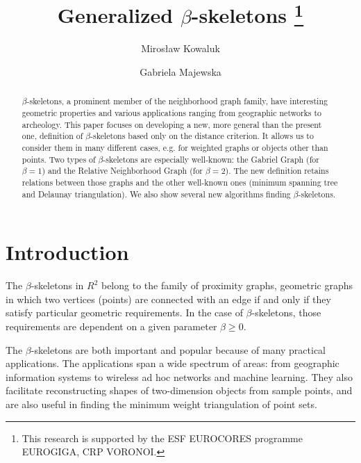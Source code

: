\documentclass[11pt]{llncs}
\begin{document}
\title{Generalized $\beta$-skeletons
\thanks{This research is supported by the ESF EUROCORES programme EUROGIGA,
CRP VORONOI.}}
\author{
        Miros{\l}aw Kowaluk  
\and
        Gabriela Majewska  
}


\maketitle

\begin{abstract}
$\beta$-skeletons, a prominent member of the neighborhood graph family, have
interesting geometric properties and various applications ranging from
geographic networks to archeology.
This paper focuses on developing a new, more general than the present one, definition
of $\beta$-skeletons based only on the distance criterion.
It allows us to consider them in many different cases, e.g. for weighted graphs 
or objects other than points.
Two types of $\beta$-skeletons are especially well-known: the Gabriel Graph 
(for $\beta = 1$) and the Relative Neighborhood Graph (for $\beta = 2$).
The new definition retains relations between those graphs and the other well-known ones
(minimum spanning tree and Delaunay triangulation).
We also show several new algorithms finding $\beta$-skeletons.           
\end{abstract} 


\section{Introduction}

The $\beta$-skeletons \cite{kr85} in $R^2$ belong to the family of
proximity graphs, geometric graphs in which two vertices (points) are connected
with an edge if and only if they satisfy particular geometric requirements.
In the case of $\beta$-skeletons, those requirements are dependent on a given parameter 
$\beta \geq 0$. 
 
The $\beta$-skeletons are both important and popular because of many practical 
applications. The applications span a wide spectrum of areas: 
from geographic information systems to wireless ad hoc networks and machine learning. 
They also facilitate reconstructing  shapes of two-dimension objects from 
sample points, and are also useful in finding the minimum weight triangulation 
of point sets. 
  
\end{document}

